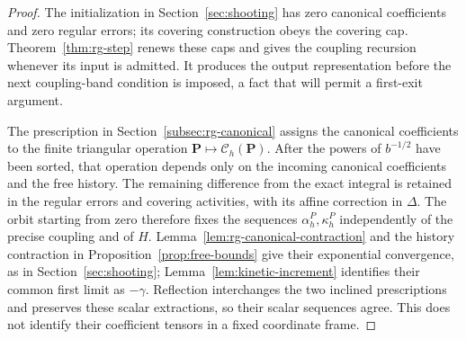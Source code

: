 \begin{proof}
The initialization in Section~\ref{sec:shooting} has zero canonical
coefficients and zero regular errors; its covering construction obeys
the covering cap.  Theorem~\ref{thm:rg-step} renews these caps and
gives the coupling recursion whenever its input is admitted.  It
produces the output representation before the next coupling-band
condition is imposed, a fact that will permit a first-exit argument.

The prescription in Section~\ref{subsec:rg-canonical} assigns the
canonical coefficients to the finite triangular operation
$\mathbf P\mapsto\mathcal C_h(\mathbf P)$.  After the powers of
$b^{-1/2}$ have been sorted, that operation depends only on the
incoming canonical coefficients and the free history.  The remaining
difference from the exact integral is retained in the regular errors
and covering activities, with its affine correction in $\Delta$.
The orbit starting from zero therefore fixes the sequences
$\alpha_h^P,\kappa_h^P$ independently of the precise coupling and
of $H$.  Lemma~\ref{lem:rg-canonical-contraction} and the history
contraction in Proposition~\ref{prop:free-bounds} give their
exponential convergence, as in Section~\ref{sec:shooting};
Lemma~\ref{lem:kinetic-increment} identifies their common first
limit as $-\gamma$.  Reflection interchanges the two inclined
prescriptions and preserves these scalar extractions, so their
scalar sequences agree.  This does not identify their coefficient
tensors in a fixed coordinate frame.


\end{proof}

